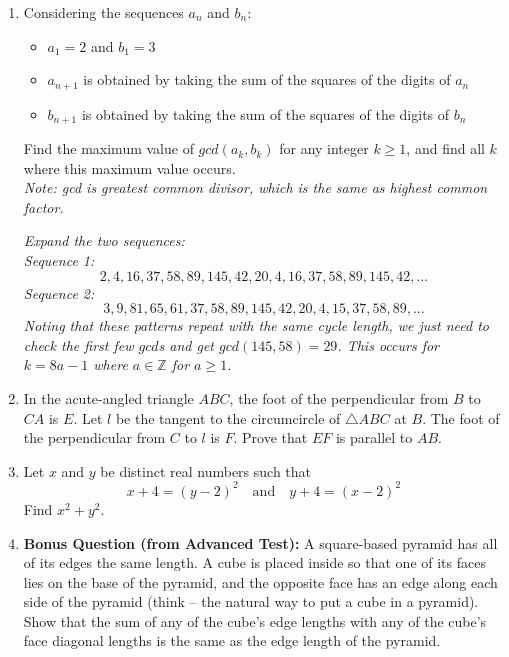 \documentclass{article}
\begin{document}
\begin{enumerate}[1.]
\item %
Considering the sequences $a_n$ and $b_n$:
\begin{itemize}
\item $a_1=2$ and $b_1=3$
\item $a_{n+1}$ is obtained by taking the sum of the squares of the digits of $a_{n}$
\item $b_{n+1}$ is obtained by taking the sum of the squares of the digits of $b_n$
\end{itemize}
Find the maximum value of $gcd(a_k,b_k)$ for any integer $k\geq 1$, and find all $k$ where this maximum value occurs.\\
\textit{Note: gcd is greatest common divisor, which is the same as highest common factor.}

{\itshape Expand the two sequences:\\
Sequence 1: $$2,4,16,37,58,89,145,42,20,4,16,37,58,89,145,42,...$$ Sequence 2: $$3,9,81,65,61,37,58,89,145,42,20,4,15,37,58,89,...$$ Noting that these patterns repeat with the same cycle length, we just need to check the first few $gcd$s and get $gcd(145,58)=29$. This occurs for $k=8a-1$ where $a\in \mathbb{Z}$ for $a\geq 1$.}


\item %
In the acute-angled triangle $ABC$, the foot of the perpendicular from $B$ to $CA$ is $E$. Let $l$ be the tangent to the circumcircle of $\triangle ABC$ at $B$. The foot of the perpendicular from $C$ to $l$ is $F$. Prove that $EF$ is parallel to $AB$.


\item %
Let $x$ and $y$ be distinct real numbers such that $$x + 4 = (y - 2)^2 \quad\text{and}\quad y + 4 = (x - 2)^2$$
Find $x^2 + y^2$.


\item %
\textbf{Bonus Question (from Advanced Test):}
A square-based pyramid has all of its edges the same length.
A cube is placed inside so that one of its faces lies on the base of the pyramid, and the opposite face has an edge along each side of the pyramid (think -- the natural way to put a cube in a pyramid).
Show that the sum of any of the cube's edge lengths with any of the cube's face diagonal lengths is the same as the edge length of the pyramid.


\end{enumerate}
\end{document}
